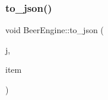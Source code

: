 \mbox{\label{namespace_beer_engine_adda2b4038b06099373d181ef4d3baed0}} 
\subsubsection{\texorpdfstring{to\+\_\+json()}{to\_json()}\hspace{0.1cm}{\footnotesize\ttfamily [2/2]}}
{\footnotesize\ttfamily void Beer\+Engine\+::to\+\_\+json (\begin{DoxyParamCaption}\item[{nlohmann\+::json \&}]{j,  }\item[{\mbox{\hyperlink{class_beer_engine_1_1_json_serializable}{Json\+Serializable}} $\ast$}]{item }\end{DoxyParamCaption})}

